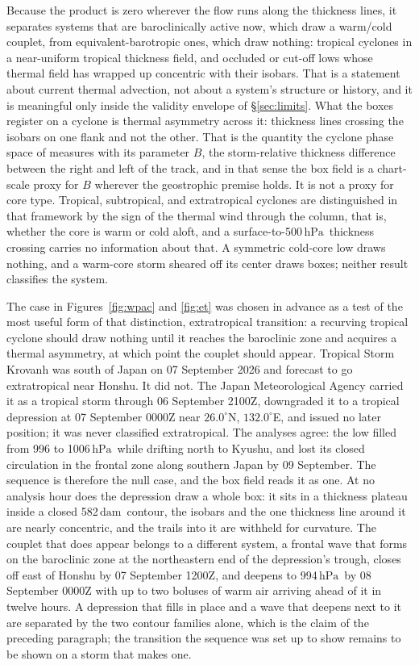 \documentclass[11pt]{article}
\newcommand{\hPa}{\ensuremath{\,\mathrm{hPa}}}
\newcommand{\dam}{\ensuremath{\,\mathrm{dam}}}
\begin{document}
Because the product is zero wherever the flow runs along the thickness lines, it separates systems that are baroclinically active now, which draw a warm/cold couplet, from equivalent-barotropic ones, which draw nothing: tropical cyclones in a near-uniform tropical thickness field, and occluded or cut-off lows whose thermal field has wrapped up concentric with their isobars. That is a statement about current thermal advection, not about a system's structure or history, and it is meaningful only inside the validity envelope of \S\ref{sec:limits}. What the boxes register on a cyclone is thermal asymmetry across it: thickness lines crossing the isobars on one flank and not the other. That is the quantity the cyclone phase space of \citet{hart2003} measures with its parameter $B$, the storm-relative thickness difference between the right and left of the track, and in that sense the box field is a chart-scale proxy for $B$ wherever the geostrophic premise holds. It is not a proxy for core type. Tropical, subtropical, and extratropical cyclones are distinguished in that framework by the sign of the thermal wind through the column, that is, whether the core is warm or cold aloft, and a surface-to-500\hPa\ thickness crossing carries no information about that. A symmetric cold-core low draws nothing, and a warm-core storm sheared off its center draws boxes; neither result classifies the system.

The case in Figures~\ref{fig:wpac} and \ref{fig:et} was chosen in advance as a test of the most useful form of that distinction, extratropical transition: a recurving tropical cyclone should draw nothing until it reaches the baroclinic zone and acquires a thermal asymmetry, at which point the couplet should appear. Tropical Storm Krovanh was south of Japan on 07 September 2026 and forecast to go extratropical near Honshu. It did not. The Japan Meteorological Agency carried it as a tropical storm through 06 September 2100Z, downgraded it to a tropical depression at 07 September 0000Z near $26.0^\circ$N, $132.0^\circ$E, and issued no later position; it was never classified extratropical. The analyses agree: the low filled from 996 to 1006\hPa\ while drifting north to Kyushu, and lost its closed circulation in the frontal zone along southern Japan by 09 September. The sequence is therefore the null case, and the box field reads it as one. At no analysis hour does the depression draw a whole box: it sits in a thickness plateau inside a closed 582\dam\ contour, the isobars and the one thickness line around it are nearly concentric, and the trails into it are withheld for curvature. The couplet that does appear belongs to a different system, a frontal wave that forms on the baroclinic zone at the northeastern end of the depression's trough, closes off east of Honshu by 07 September 1200Z, and deepens to 994\hPa\ by 08 September 0000Z with up to two boluses of warm air arriving ahead of it in twelve hours. A depression that fills in place and a wave that deepens next to it are separated by the two contour families alone, which is the claim of the preceding paragraph; the transition the sequence was set up to show remains to be shown on a storm that makes one.
\end{document}
